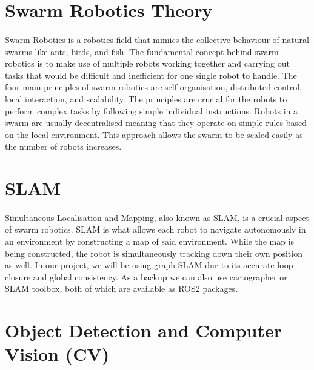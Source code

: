 \section{Swarm Robotics Theory}

\paragraph*{}
Swarm Robotics is a robotics field that mimics the collective behaviour of natural swarms like ants, birds, and fish. The fundamental concept behind swarm robotics is to make use of multiple robots working together and carrying out tasks that would be difficult and inefficient for one single robot to handle. The four main principles of swarm robotics are self-organisation, distributed control, local interaction, and scalability. The principles are crucial for the robots to perform complex tasks by following simple individual instructions. Robots in a swarm are usually decentralised meaning that they operate on simple rules based on the local environment. This approach allows the swarm to be scaled easily as the number of robots increases\cite{beni1989swarm}.

\section{SLAM}

\paragraph*{}
Simultaneous Localisation and Mapping, also known as SLAM, is a crucial aspect of swarm robotics. SLAM is what allows each robot to navigate autonomously in an environment by constructing a map of said environment. While the map is being constructed, the robot is simultaneously tracking down their own position as well\cite{thrun2003probabilistic}. In our project, we will be using graph SLAM due to its accurate loop closure and global consistency. As a backup we can also use cartographer or SLAM toolbox, both of which are available as ROS2 packages.

\section{Object Detection and Computer Vision (CV)}

